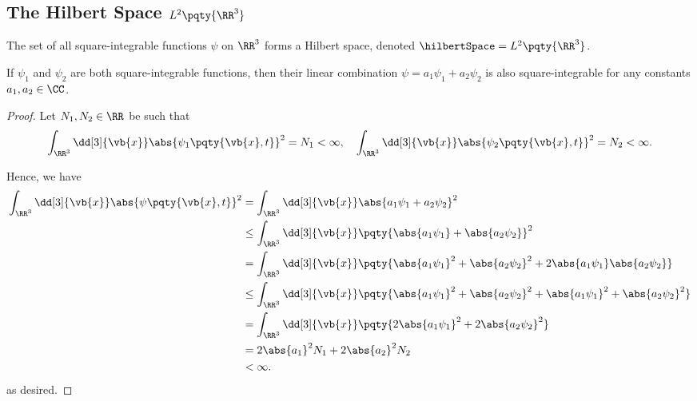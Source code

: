 \subsection{The Hilbert Space \(L^2\pqty{\RR^3}\)}

\begin{definition}
    The set of all square-integrable functions \(\psi\) on \(\RR^3\) forms a Hilbert space, denoted \(\hilbertSpace = L^2\pqty{\RR^3}\).
\end{definition}

\begin{theorem}
    If \(\psi_1\) and \(\psi_2\) are both square-integrable functions, then their linear combination \(\psi = a_1 \psi_1 + a_2 \psi_2\) is also square-integrable for any constants \(a_1, a_2 \in \CC\).
\end{theorem}

\begin{proof}
    Let \(N_1, N_2 \in \RR\) be such that
    \begin{equation}
        \int_{\RR^3} \dd[3]{\vb{x}} \abs{\psi_1\pqty{\vb{x}, t}}^2 = N_1 < \infty, \quad
        \int_{\RR^3} \dd[3]{\vb{x}} \abs{\psi_2\pqty{\vb{x}, t}}^2 = N_2 < \infty.
    \end{equation}

    Hence, we have
    \begin{subequations}
        \begin{align}
            \int_{\RR^3} \dd[3]{\vb{x}} \abs{\psi\pqty{\vb{x}, t}}^2 &= \int_{\RR^3} \dd[3]{\vb{x}} \abs{a_1 \psi_1 + a_2 \psi_2}^2 \\
            &\leq \int_{\RR^3} \dd[3]{\vb{x}} \pqty{\abs{a_1 \psi_1} + \abs{a_2 \psi_2}}^2 \\
            &= \int_{\RR^3} \dd[3]{\vb{x}} \pqty{\abs{a_1 \psi_1}^2 + \abs{a_2 \psi_2}^2 + 2 \abs{a_1 \psi_1} \abs{a_2 \psi_2}} \\
            &\leq \int_{\RR^3} \dd[3]{\vb{x}} \pqty{\abs{a_1 \psi_1}^2 + \abs{a_2 \psi_2}^2 + \abs{a_1 \psi_1}^2 + \abs{a_2 \psi_2}^2} \\
            &= \int_{\RR^3} \dd[3]{\vb{x}} \pqty{2 \abs{a_1 \psi_1}^2 + 2 \abs{a_2 \psi_2}^2} \\
            &= 2 \abs{a_1}^2 N_1 + 2 \abs{a_2}^2 N_2 \\
            &< \infty.
        \end{align}
    \end{subequations}
    as desired.
\end{proof}

